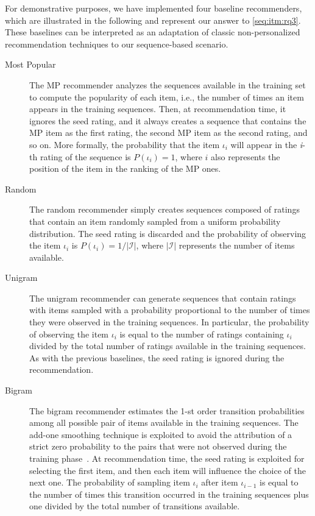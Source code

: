 For demonstrative purposes, we have implemented four baseline recommenders, which are illustrated in the following and represent our answer to \ref{seq:itm:rq3}. These baselines can be interpreted as an adaptation of classic non-personalized recommendation techniques to our sequence-based scenario.

\begin{description}
\item[Most Popular] The MP recommender analyzes the sequences available in the training set to compute the popularity of each item, i.e., the number of times an item appears in the training sequences. Then, at recommendation time, it ignores the seed rating, and it always creates a sequence that contains the MP item as the first rating, the second MP item as the second rating, and so on. More formally, the probability that the item $\iota_i$ will appear in the \textit{i}-th rating of the sequence is $P(\iota_i) = 1$, where $i$ also represents the position of the item in the ranking of the MP ones.
\item[Random] The random recommender simply creates sequences composed of ratings that contain an item randomly sampled from a uniform probability distribution. The seed rating is discarded and the probability of observing the item $\iota_i$ is $P(\iota_i) = 1 / |\mathcal{I}|$, where $|\mathcal{I}|$ represents the number of items available.
\item[Unigram] The unigram recommender can generate sequences that contain ratings with items sampled with a probability proportional to the number of times they were observed in the training sequences. In particular, the probability of observing the item $\iota_i$ is equal to the number of ratings containing $\iota_i$ divided by the total number of ratings available in the training sequences. As with the previous baselines, the seed rating is ignored during the recommendation.
\item[Bigram] The bigram recommender estimates the 1{-st} order transition probabilities among all possible pair of items available in the training sequences. The add-one smoothing technique is exploited to avoid the attribution of a strict zero probability to the pairs that were not observed during the training phase~\cite{Chen1999}. At recommendation time, the seed rating is exploited for selecting the first item, and then each item will influence the choice of the next one. The probability of sampling item $\iota_i$ after item $\iota_{i - 1}$ is equal to the number of times this transition occurred in the training sequences plus one divided by the total number of transitions available.
\end{description}

